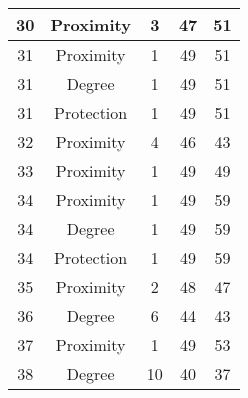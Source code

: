 \documentclass[results.tex]{subfiles}
\begin{document}
\begin{center}
\begin{tabular}{| c || c | c | c | c |}
            \hline
            30                      & Proximity                    & 3                      & 47                      & 51                   \\
            \hline
            31                      & Proximity                    & 1                      & 49                      & 51                   \\
            \hline
            31                      & Degree                       & 1                      & 49                      & 51                   \\
            \hline
            31                      & Protection                   & 1                      & 49                      & 51                   \\
            \hline
            32                      & Proximity                    & 4                      & 46                      & 43                   \\
            \hline
            33                      & Proximity                    & 1                      & 49                      & 49                   \\
            \hline
            34                      & Proximity                    & 1                      & 49                      & 59                   \\
            \hline
            34                      & Degree                       & 1                      & 49                      & 59                   \\
            \hline
            34                      & Protection                   & 1                      & 49                      & 59                   \\
            \hline
            35                      & Proximity                    & 2                      & 48                      & 47                   \\
            \hline
            36                      & Degree                       & 6                      & 44                      & 43                   \\
            \hline
            37                      & Proximity                    & 1                      & 49                      & 53                   \\
            \hline
            38                      & Degree                       & 10                     & 40                      & 37                   \\

\end{tabular}
\end{center}
\end{document}
